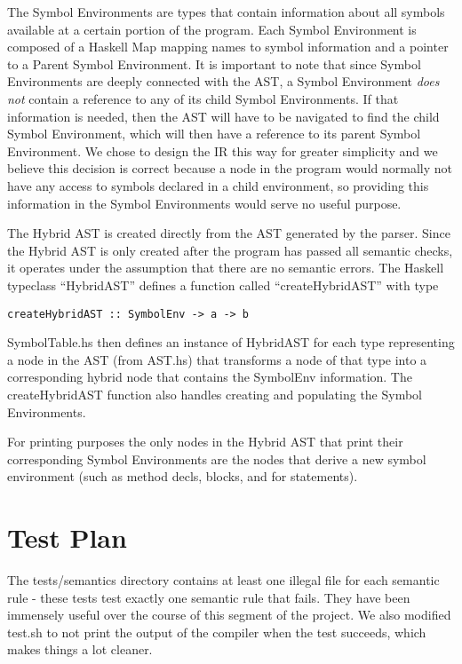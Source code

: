 \documentclass[11pt]{article}
\begin{document}
The Symbol Environments are types that contain information about all symbols available at a certain portion of the program. Each Symbol Environment is composed of a Haskell Map mapping names to symbol information and a pointer to a Parent Symbol Environment. It is important to note that since Symbol Environments are deeply connected with the AST, a Symbol Environment \emph{does not} contain a reference to any of its child Symbol Environments. If that information is needed, then the AST will have to be navigated to find the child Symbol Environment, which will then have a reference to its parent Symbol Environment. We chose to design the IR this way for greater simplicity and we believe this decision is correct because a node in the program would normally not have any access to symbols declared in a child environment, so providing this information in the Symbol Environments would serve no useful purpose. 

The Hybrid AST is created directly from the AST generated by the parser. Since the Hybrid AST is only created after the program has passed all semantic checks, it operates under the assumption that there are no semantic errors. The Haskell typeclass ``HybridAST'' defines a function called ``createHybridAST'' with type 
\begin{verbatim}
createHybridAST :: SymbolEnv -> a -> b
\end{verbatim} 

SymbolTable.hs then defines an instance of HybridAST for each type representing a node in the AST (from AST.hs) that transforms a node of that type into a corresponding hybrid node that contains the SymbolEnv information. The createHybridAST function also handles creating and populating the Symbol Environments.

For printing purposes the only nodes in the Hybrid AST that print their corresponding Symbol Environments are the nodes that derive a new symbol environment (such as method decls, blocks, and for statements). 

\section{Test Plan}
\label{sec:test}
The tests/semantics directory contains at least one illegal file for each semantic rule - these tests test exactly one semantic rule that fails. They have been immensely useful over the course of this segment of the project. We also modified test.sh to not print the output of the compiler when the test succeeds, which makes things a lot cleaner.
\end{document}
